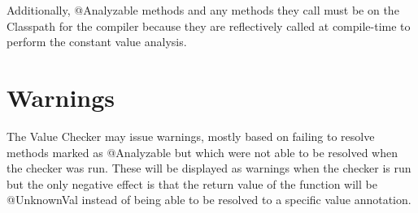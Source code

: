 Additionally, @Analyzable methods and any methods they call must be on
the Classpath for the compiler because they are reflectively called at
compile-time to perform the constant value analysis.

\section{Warnings}
The Value Checker may issue warnings, mostly based on failing to
resolve methods marked as @Analyzable but which were not able to be
resolved when the checker was run. These will be displayed as warnings when
the checker is run but the only negative effect is that the return
value of the function will be @UnknownVal instead of being able to be
resolved to a specific value annotation.

